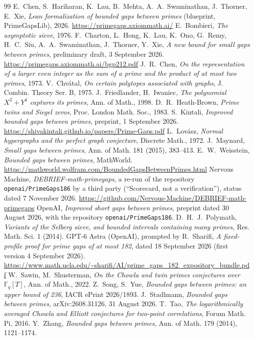 \documentclass[11pt]{amsart}
\theoremstyle{definition}
\theoremstyle{remark}
\begin{document}
\begin{thebibliography}{99}
 E.~Chen, S.~Hariharan, K.~Lau, B.~Mehta, A.~A.~Swaminathan,
J.~Thorner, E.~Xie, \emph{Lean formalization of bounded gaps between primes}
(blueprint, PrimeGapsLib), 2026. \url{https://primegaps.axiommath.ai/}
 E.~Bombieri, \emph{The asymptotic sieve}, 1976.
 F.~Charton, L.~Hong, K.~Lau, K.~Ono, G.~Remy, H.~C.~Siu,
A.~A.~Swaminathan, J.~Thorner, Y.~Xie, \emph{A new bound for small gaps
between primes}, preliminary draft, 3 September 2026.
\url{https://primegaps.axiommath.ai/bgp212.pdf}
 J.~R.~Chen, \emph{On the representation of a larger even
integer as the sum of a prime and the product of at most two primes}, 1973.
 V.~Chv\'atal, \emph{On certain polytopes associated with
graphs}, J. Combin. Theory Ser. B, 1975.
 J.~Friedlander, H.~Iwaniec, \emph{The polynomial $X^2+Y^4$
captures its primes}, Ann. of Math., 1998.
 D.~R.~Heath-Brown, \emph{Prime twins and Siegel zeros}, Proc.
London Math. Soc., 1983.
 S.~Kintali, \emph{Improved bounded gaps between primes},
preprint, 1 September 2026.
\url{https://shivakintali.github.io/papers/Prime-Gaps.pdf}
 L.~Lov\'asz, \emph{Normal hypergraphs and the perfect graph
conjecture}, Discrete Math., 1972.
 J.~Maynard, \emph{Small gaps between primes}, Ann. of Math.
181 (2015), 383--413.
 E.~W.~Weisstein, \emph{Bounded gaps between primes}, MathWorld.
\url{https://mathworld.wolfram.com/BoundedGapsBetweenPrimes.html}
 Nervous Machine, \emph{DEBRIEF-math-primegaps}, a re-run of
the repository \texttt{openai/PrimeGaps186} by a third party (``Scorecard, not
a verification''), status dated 7 November 2026.
\url{https://github.com/Nervous-Machine/DEBRIEF-math-primegaps}
 OpenAI, \emph{Improved short gaps between primes}, preprint
dated 30 August 2026, with the repository \texttt{openai/PrimeGaps186}.
 D.~H.~J.~Polymath, \emph{Variants of the Selberg sieve, and
bounded intervals containing many primes}, Res. Math. Sci. 1 (2014).
 GPT-6 Astra (OpenAI), prompted by R.~Sharifi, \emph{A
fixed-profile proof for prime gaps of at most 182}, dated 18 September 2026
(first version 4 September 2026).
\url{https://www.math.ucla.edu/~sharifi/AI/prime_gaps_182_expository_bundle.pdf}
 W.~Sawin, M.~Shusterman, \emph{On the Chowla and twin primes
conjectures over $\mathbb F_q[T]$}, Ann. of Math., 2022.
 Z.~Song, S.~Yue, \emph{Bounded gaps between primes: an upper
bound of 236}, IACR ePrint 2026/1893.
 J.~Stadlmann, \emph{Bounded gaps between primes},
arXiv:2608.31126, 31 August 2026.
 T.~Tao, \emph{The logarithmically averaged Chowla and Elliott
conjectures for two-point correlations}, Forum Math. Pi, 2016.
 Y.~Zhang, \emph{Bounded gaps between primes}, Ann. of Math.
179 (2014), 1121--1174.
\end{thebibliography}
\end{document}
